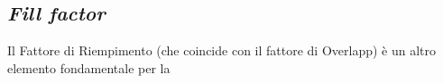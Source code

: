 \subsection{\emph{Fill factor}}\label{sec:density}

Il Fattore di Riempimento\cite{Roads2001} (che coincide con il fattore di Overlapp) 
è un altro elemento fondamentale per la 


